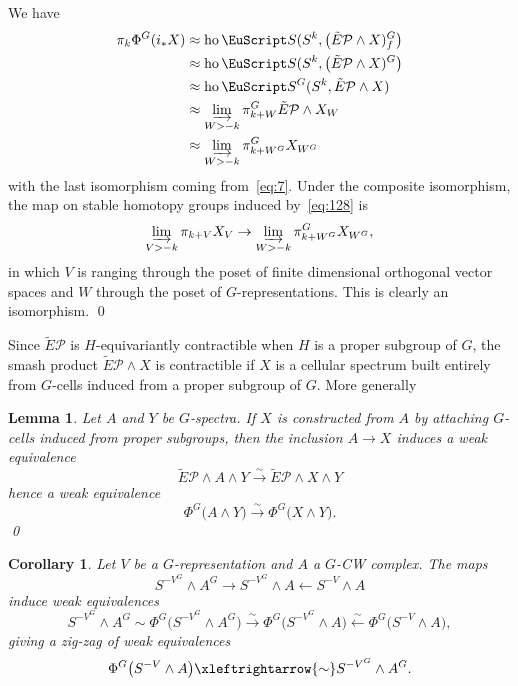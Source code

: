 \documentclass{amsart}
\newtheorem{cor}[equation]{Corollary}
\newtheorem{lem}[equation]{Lemma}
\theoremstyle{definition}
\theoremstyle{remark}
\newenvironment{pf}{\bigskip{\em Proof:\/}}{\qed\medskip}
\newcommand{\spectra}{\EuScript S}
\DeclareMathOperator{\ho}{ho}
\newcommand{\gfp}[1]{\Phi^{#1}}
\newcommand{\phig}{\gfp{G}}
\newcommand{\ugspectra}[1]{\spectra^{#1}}
\newcommand{\pfamily}{\mathcal P}
\begin{document}
\begin{pf}
We have
\begin{align*}
\pi_{k}\phig(i_{\ast}X) &\approx \ho\spectra(S^{k},\big(\tilde
E\pfamily\wedge X)^{G}_{f}\big) \\
&\approx \ho\spectra(S^{k},\big(\tilde
E\pfamily\wedge X)^{G}\big) \\
&\approx \ho\ugspectra{G}(S^{k},\tilde
E\pfamily\wedge X) \\
&\approx \varinjlim_{W> -k} \pi^{G}_{k+W}\tilde E\pfamily\wedge X_{W} \\
&\approx \varinjlim_{W> -k} \pi^{G}_{k+W^{G}}X_{W^{G}}
\end{align*}
with the last isomorphism coming from~\eqref{eq:7}.  Under the
composite isomorphism, the map on stable homotopy groups induced
by~\eqref{eq:128} is
\[
\varinjlim_{V>-k} \pi_{k+V}X_{V} \to 
\varinjlim_{W> -k} \pi^{G}_{k+W^{G}}X_{W^{G}},
\]
in which $V$ is ranging through the poset of finite dimensional
orthogonal vector spaces and $W$ through the poset of
$G$-representations.  This is clearly an isomorphism.
\end{pf}

Since $\tilde E\pfamily$ is $H$-equivariantly contractible when $H$ is
a proper subgroup of $G$, the smash product $\tilde E\pfamily\wedge X$
is contractible if $X$ is a cellular spectrum built entirely from
$G$-cells induced from a proper subgroup of $G$.  More generally
\begin{lem}
\label{thm:245} 
Let $A$ and $Y$ be $G$-spectra.  If $X$ is constructed from $A$ by
attaching $G$-cells induced from proper subgroups, then the inclusion
$A\to X$ induces a weak equivalence
\[
\tilde E\pfamily \wedge A\wedge Y \xrightarrow{\sim}{}
\tilde E\pfamily \wedge X \wedge Y
\]
hence a weak equivalence 
\[
\phig \big(A\wedge Y\big)\xrightarrow{\sim}{} \phig \big(X\wedge Y\big). 
\]
\qed
\end{lem}

\begin{cor}
\label{thm:205}
Let $V$ be a $G$-representation and $A$ a $G$-CW complex.  The maps 
\[
S^{-V^{G}}\wedge A^{G} \to S^{-V^{G}} \wedge A \leftarrow S^{-V} \wedge A
\]
induce weak equivalences  
\[
S^{-V^{G}}\wedge A^{G} \sim \phig \big(S^{-V^{G}}\wedge A^{G}
\big)\xrightarrow{\sim}{} \phig \big(S^{-V^{G}}\wedge A
\big)\xleftarrow{\sim} \phig \big(S^{-V}\wedge A\big),
\]
giving a zig-zag of weak equivalences
\[
\phig \big(S^{-V}\wedge A\big) \xleftrightarrow{\sim} S^{-V^{G}}\wedge A^{G}.
\]
\end{cor}
\end{document}
